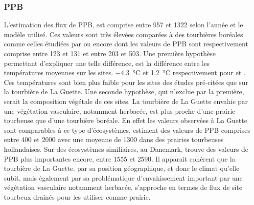 \subsubsection{PPB}

%


L'estimation des flux de PPB, est comprise entre 957 et \SI{1322}{\gcma} selon l'année et le modèle utilisé.
Ces valeurs sont très élevées comparées à des tourbières boréales comme celles étudiées par \citep{trudeau2014} ou encore \citep{peichl2014} dont les valeurs de PPB sont respectivement comprise entre 123 et \SI{131}{\gcma} et entre 203 et \SI{503}{\gcma}.
Une première hypothèse permettant d'expliquer une telle différence, est la différence entre les températures moyennes sur les sites.
\SI{-4.3}{\degreeCelsius} et \SI{1.2}{\degreeCelsius} respectivement pour \citet{trudeau2014} et \citet{peichl2014}.
Ces températures sont bien plus faible pour les sites des études pré-citées que sur la tourbière de La Guette.
Une seconde hypothèse, qui n'exclue par la première, serait la composition végétale de ces sites. 
La tourbière de La Guette envahie par une végétation vasculaire, notamment herbacée, est plus proche d'une prairie tourbeuse que d'une tourbière boréale.
En effet les valeurs observées à La Guette sont comparables à ce type d'écosystèmes.
\citet{jacobs2007} estiment des valeurs de PPB comprises entre 400 et \SI{2000}{\gcma} avec une moyenne de \SI{1300}{\gcma} dans des prairies tourbeuses hollandaises.
Sur des écosystèmes similiaires, au Danemark, \citep{gorres2014} trouve des valeurs de PPB plus importantes encore, entre 1555 et \SI{2590}{\gcma}.
Il apparait cohérent que la tourbière de La Guette, par sa position géographique, et donc le climat qu'elle subit, mais également par sa problématique d'envahissement important par une végétation vasculaire notamment herbacée, s'approche en termes de flux de site tourbeux drainés pour les utiliser comme prairie.
%
%
%
%

